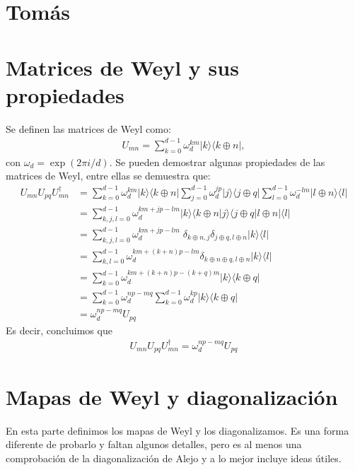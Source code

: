 \section*{Tomás}
%
\section{Matrices de Weyl y sus propiedades} %
Se definen las matrices de Weyl como:
\begin{align*}
U_{mn} = \sum_{k = 0}^{d-1} \omega_d^{km} |k\rangle \langle k \oplus n |,
\end{align*}
con $\omega_d = \exp(2\pi  i /d)$. Se pueden demostrar algunas propiedades de las matrices de Weyl, entre ellas se demuestra que:
\begin{align*}
U_{mn} U_{pq} U_{mn}^{\dagger} & = \sum_{k = 0}^{d-1} \omega_d^{km} |k\rangle \langle k \oplus n |   \sum_{j = 0}^{d-1} \omega_d^{jp} |j\rangle \langle j \oplus q |   \sum_{l = 0}^{d-1} \omega_d^{-lm} | l \oplus n\rangle \langle l| \\
& = \sum_{k,j,l=0}^{d-1} \omega_d^{km+jp-lm} |k \rangle \langle k \oplus n| j \rangle \langle j \oplus q | l \oplus n| \langle l | \\
& = \sum_{k,j,l=0}^{d-1} \omega_d^{km+jp-lm} \; \delta_{k\oplus n, j} \delta_{j\oplus q, l \oplus n} |k \rangle \langle l | \\
& = \sum_{k,l=0}^{d-1} \omega_d^{km + (k + n)p - lm} \delta_{k \oplus n \oplus q , l \oplus n} |k \rangle \langle l | \\
&= \sum_{k=0}^{d-1} \omega_d^{km + (k+n)p - (k+q)m} |k \rangle \langle k \oplus q | \\
& = \sum_{k=0}^{d-1} \omega_d^{np-mq} \sum_{k=0}^{d-1} \omega_d^{kp} |k \rangle \langle k \oplus q | \\
&=  \omega_d^{np-mq} U_{pq} 
\end{align*}
Es decir, concluimos que
\begin{align}
\label{conmutación matrices de Weyl}
U_{mn} U_{pq} U_{mn}^{\dagger}  = \omega_d^{np-mq} U_{pq} 
\end{align}

\section{Mapas de Weyl y diagonalización} %
En esta parte definimos los mapas de Weyl y los diagonalizamos. Es una forma diferente de probarlo y faltan algunos detalles, pero es al menos una comprobación de la diagonalización de Alejo y a lo mejor incluye ideas útiles. 

